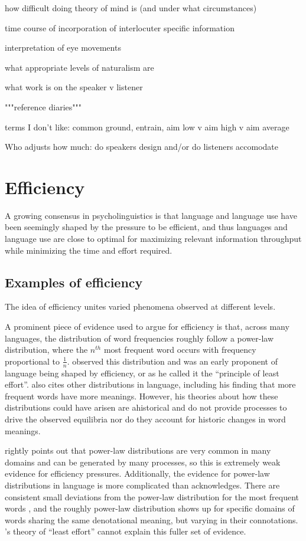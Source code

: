\documentclass[]{article}
\begin{document}
how difficult doing theory of mind is (and under what circumstances)

time course of incorporation of interlocuter specific information 

interpretation of eye movements

what appropriate levels of naturalism are

what work is on the speaker v listener

"""reference diaries"""

terms I don't like: common ground, entrain, aim low v aim high v aim average

Who adjusts how much: do speakers design and/or do listeners accomodate








\section{Efficiency}

A growing consensus in psycholinguistics is that language and language use have been seemingly shaped by the pressure to be efficient, and thus languages and language use are close to optimal for maximizing relevant information throughput while minimizing the time and effort required. 


\subsection{Examples of efficiency}
The idea of efficiency unites varied phenomena observed at different levels. 

A prominent piece of evidence used to argue for efficiency is that, across many languages, the distribution of word frequencies roughly follow a power-law distribution, where the $n^{th}$ most frequent word occurs with frequency proportional to $\frac{1}{n}$. \cite{zipf1949} observed this distribution and was an early proponent of language being shaped by efficiency, or as he called it the ``principle of least effort''. \cite{zipf1949} also cites other distributions in language, including his finding that more frequent words have more meanings. However, his theories about how these distributions could have arisen are ahistorical and do not provide processes to drive the observed equilibria nor do they account for historic changes in word meanings. 

\cite{piantadosi2014} rightly points out that power-law distributions are very common in many domains and can be generated by many processes, so this is extremely weak evidence for efficiency pressures. Additionally, the evidence for power-law distributions in language is more complicated than \cite{zipf1949} acknowledges. There are consistent small deviations from the power-law distribution for the most frequent words \cite{piantadosi2014}, and the roughly power-law distribution shows up for specific domains of words sharing the same denotational meaning, but varying in their connotations. \cite{zipf1949}'s theory of ``least effort'' cannot explain this fuller set of evidence. 
\end{document}
